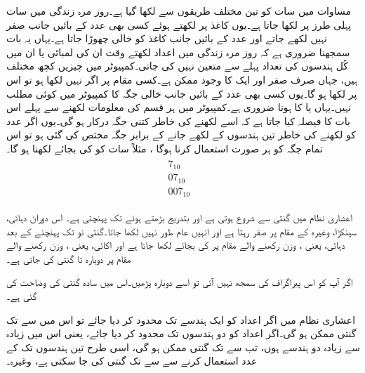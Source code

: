 	مساوات    میں سات کو تین مختلف طریقوں سے لکھا گیا ہے۔روز مرہ زندگی میں سات  پہلی طرز پر لکھا جاتا ہے۔یوں کاغذ پر لکھتے ہوئے کسی بھی عدد کے بائیں جانب صفر نہیں لکھے جاتے اور   عدد کے بائیں  جانب کاغذ کو خالی چھوڑا جاتا ہے۔یہاں یہ بات سمجھنا ضروری ہے کہ روز مرہ زندگی میں اعداد لکھتے وقت ان کی لمبائی یا ان میں کُل ہندسوں کی تعداد پہلے سے متعین نہیں کی جاتی۔کمپیوٹر میں چیزیں  کچھ  مختلف ہیں، جہاں صرف صفر  اور ایک   کا وجود ممکن ہے۔کسی مقام پر اگر   نہیں لکھا ہو تو اس پر   لکھا ہو  گا۔یوں کسی بھی عدد کے بائیں جانب خالی جگہ کا کمپیوٹر میں کوئی مطلب نہیں۔یہاں     یا    کا ہونا ضروری ہے۔کمپیوٹر میں ہر قسم کی معلومات لکھنے سے پہلے اس بات کا فیصلہ کیا جاتا ہے کہ اسے لکھنے کی خاطر کتنی جگہ  درکار ہو گی۔یوں اگر  عدد کو لکھنے کی خاطر تین ہندسوں کے لکھے جانے کے برابر جگہ مختص  کی گئی ہو تو اس تمام جگہ کو ہر صورت استعمال کرنا ہوگا ، مثلاً  سات کو       کی بجائے   لکھنا ہو گا۔
\begin{gather}
\begin{aligned}\label{مساوات_ثنائی_ہندسوں}
7_{10} &\\
07_{10}&\\
007_{10}&
\end{aligned}
\end{gather}

	اعشاری نظام میں گنتی     سے شروع ہوتی ہے اور بتدریج بڑھتے ہوئے    تک پہنچتی ہے۔ اس دوران دہائی، سینکڑا، وغیرہ کے مقام پر صفر رہتا ہے اور انہیں عام طور نہیں لکھا جاتا۔گنتی   نو  تک پہنچنے کے بعد دہائی،  یعنی ،   وزن رکھنے والے مقام پر    کی بجائے   لکھا جاتا ہے اور اکائی،  یعنی ،     وزن رکھنے والے مقام پر دوبارہ   تا   گنتی کی جاتی  ہے۔ 
	
	اگر آپ کو اس پیراگراف کی سمجھ نہیں آئی تو اسے دوبارہ پڑھیں۔اس میں سادہ گنتی کی وضاحت کی گئی ہے۔ 
	
	اعشاری نظام میں اگر اعداد کو ایک ہندسے تک محدود کر دیا جائے تو اس میں    سے     تک گنتی ممکن ہو گی۔اگر اعداد کو دو ہندسوں تک محدود کر دیا جائے، یعنی اس میں زیادہ سے زیادہ دو ہندسے ہوں، تب    سے     تک گنتی ممکن ہو گی، اسی طرح  تین ہندسوں تک کے عدد استعمال کرنے سے     سے   تک گنتی کی جا سکتی ہے،  وغیرہ۔
	 


